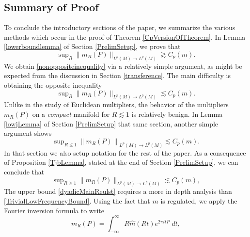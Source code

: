 
\subsection{Summary of Proof} To conclude the introductory sections of the paper, we summarize the various methods which occur in the proof of Theorem \ref{CpVersionOfTheorem}. In Lemma \ref{lowerboundlemma} of Section \ref{PrelimSetup}, we prove that
%
\begin{equation} \label{nonoppositeinequality}
    \sup\nolimits_R \| m_R(P) \|_{L^p(M) \to L^p(M)} \gtrsim C_p(m).
\end{equation}
%
We obtain \eqref{nonoppositeinequality} via a relatively simple argument, as might be expected from the discussion in Section \ref{transference}. The main difficulty is obtaining the opposite inequality
%
\begin{equation} \label{oppositeinequality}
    \sup\nolimits_R \| m_R(P) \|_{L^p(M) \to L^p(M)} \lesssim C_p(m).
\end{equation}
%
Unlike in the study of Euclidean multipliers, the behavior of the multipliers $m_R(P)$ on a \emph{compact} manifold for $R \lesssim 1$ is relatively benign. In Lemma \ref{lowjLemma} of Section \ref{PrelimSetup} that same section, another simple argument shows
%
\begin{equation} \label{TrivialLowFrequencyBound}
    \sup\nolimits_{R \leq 1} \left\| m_R(P) \right\|_{L^p(M) \to L^p(M)} \lesssim C_p(m).
\end{equation}
%
In that section we also setup notation for the rest of the paper. As a consequence of Proposition \ref{TjbLemma}, stated at the end of Section \ref{PrelimSetup},%
we can conclude that
%
\begin{equation} \label{dyadicMainReulst}
    \sup\nolimits_{R \geq 1} \| m_R(P) \|_{L^p(M) \to L^p(M)} \lesssim C_p(m),
\end{equation}
%
The upper bound \eqref{dyadicMainReulst} requires a more in depth analysis than \eqref{TrivialLowFrequencyBound}. Using the fact that $m$ is regulated, %
we apply the Fourier inversion formula to write
%
\begin{equation}
    m_R(P) = \int_{-\infty}^\infty R \widehat{m}(Rt) e^{2 \pi i t P}\; dt,
\end{equation}
